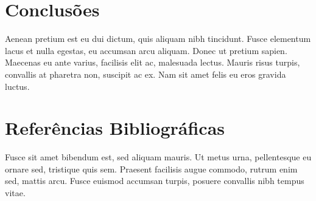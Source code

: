 \documentclass[10pt,a4paper]{article}
\begin{document}
\begin{multicols*}{2}
\section*{Conclusões}

Aenean pretium est eu dui dictum, quis aliquam nibh tincidunt. Fusce elementum
lacus et nulla egestas, eu accumsan arcu aliquam. Donec ut pretium sapien.
Maecenas eu ante varius, facilisis elit ac, malesuada lectus. Mauris risus
turpis, convallis at pharetra non, suscipit ac ex. Nam sit amet felis eu eros
gravida luctus.

\section*{Referências Bibliográficas}

Fusce sit amet bibendum est, sed aliquam mauris. Ut metus urna,
pellentesque eu ornare sed, tristique quis sem. Praesent facilisis augue
commodo, rutrum enim sed, mattis arcu. Fusce euismod accumsan turpis, posuere
convallis nibh tempus vitae.

\end{multicols*}
\end{document}
